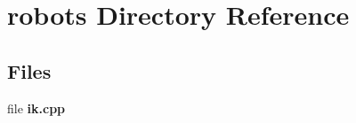 \section{robots Directory Reference}
\label{dir_e6c9fb262f4877fef5ac607949fd6d74}
\subsection*{Files}
\begin{DoxyCompactItemize}
\item 
file {\bfseries ik.\-cpp}
\end{DoxyCompactItemize}
